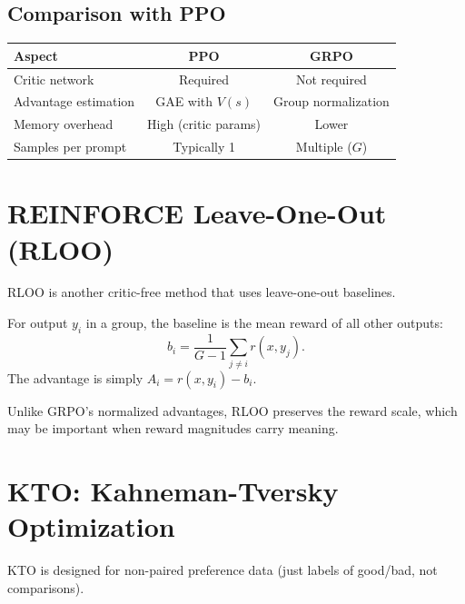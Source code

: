 \subsection{Comparison with PPO}

\begin{center}
    \begin{tabular}{lcc}
        \textbf{Aspect}      & \textbf{PPO}         & \textbf{GRPO}       \\
        \hline
        Critic network       & Required             & Not required        \\
        Advantage estimation & GAE with $V(s)$      & Group normalization \\
        Memory overhead      & High (critic params) & Lower               \\
        Samples per prompt   & Typically 1          & Multiple ($G$)      \\
    \end{tabular}
\end{center}

\section{REINFORCE Leave-One-Out (RLOO)}

RLOO is another critic-free method that uses leave-one-out baselines.

\begin{definition}
    For output $y_i$ in a group, the baseline is the mean reward of all other outputs:
    \[
        b_i = \frac{1}{G-1} \sum_{j \neq i} r(x, y_j).
    \]
    The advantage is simply $A_i = r(x, y_i) - b_i$.
\end{definition}

\begin{remark}
    Unlike GRPO's normalized advantages, RLOO preserves the reward scale, which may be important when reward magnitudes carry meaning.
\end{remark}

\section{KTO: Kahneman-Tversky Optimization}

KTO is designed for non-paired preference data (just labels of good/bad, not comparisons).

